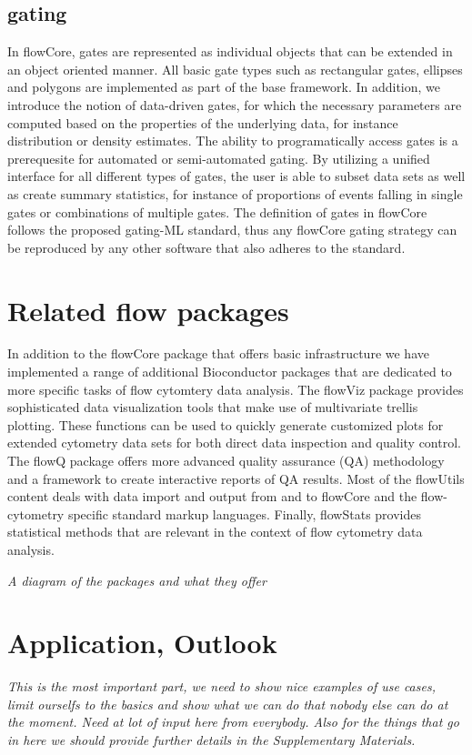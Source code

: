 \documentclass[12pt]{article}
\begin{document}
\subsection{gating}
In flowCore, gates are represented as individual objects that can be
extended in an object oriented manner. All basic gate types such as
rectangular gates, ellipses and polygons are implemented as part of
the base framework. In addition, we introduce the notion of
data-driven gates, for which the necessary parameters are computed
based on the properties of the underlying data, for instance
distribution or density estimates. The ability to programatically
access gates is a prerequesite for automated or semi-automated
gating. By utilizing a unified interface for all different types of
gates, the user is able to subset data sets as well as create summary
statistics, for instance of proportions of events falling in single
gates or combinations of multiple gates. The definition of gates in
flowCore follows the proposed gating-ML standard, thus any flowCore
gating strategy can be reproduced by any other software that also
adheres to the standard.

\section{Related flow packages}
In addition to the flowCore package that offers basic infrastructure
we have implemented a range of additional Bioconductor packages that
are dedicated to more specific tasks of flow cytomtery data
analysis. The flowViz package provides sophisticated data
visualization tools that make use of multivariate trellis
plotting. These functions can be used to quickly generate customized
plots for extended cytometry data sets for both direct data inspection
and quality control. The flowQ package offers more advanced quality
assurance (QA) methodology and a framework to create interactive
reports of QA results. Most of the flowUtils content deals with data
import and output from and to flowCore and the flow-cytometry specific
standard markup languages. Finally, flowStats provides statistical
methods that are relevant in the context of flow cytometry data
analysis.

\textit{A diagram of the packages and what they offer}

\section{Application, Outlook}
\textit{This is the most important part, we need to show nice examples
  of use cases, limit ourselfs to the basics and show what we can do
  that nobody else can do at the moment. Need at lot of input here
  from everybody. Also for the things that go in here we should
  provide further details in the Supplementary Materials.}

  
 
\end{document}
